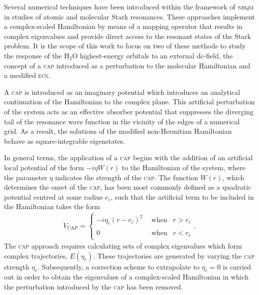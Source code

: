 Several numerical techniques have been introduced within the framework
of \textsc{nhqm} in studies of atomic and molecular Stark
resonances. These approaches implement a complex-scaled Hamiltonian by
means of a mapping operator that results in complex eigenvalues and
provide direct access to the resonant states of the Stark problem. It
is the scope of this work to focus on two of these methods to study
the response of the H$_{2}$O highest-energy orbitals to an external
dc-field, the concept of a \textsc{cap} introduced as a perturbation
to the molecular Hamiltonian and a modified \textsc{ecs}.




A \textsc{cap} is introduced as an imaginary potential which
introduces an analytical continuation of the Hamiltonian to the
complex plane. This artificial perturbation of the system acts as an
effective absorber potential that suppresses the diverging tail of the
resonance wave function in the vicinity of the edges of a numerical
grid. As a result, the solutions of the modified non-Hermitian
Hamiltonian behave as square-integrable eigenstates.

In general terms, the application of a \textsc{cap} begins with the
addition of an artificial local potential of the form $-i \eta W(r)$
to the Hamiltonian of the system, where the parameter $\eta$ indicates
the strength of the \textsc{cap}. The function $W(r)$, which
determines the onset of the \textsc{cap}, has been most commonly
defined as a quadratic potential centred at some radius
$r_{\mathrm{c}}$, such that the artificial term to be included in the
Hamiltonian takes the form
%
\begin{eqnarray}
  V_{\mathrm{CAP}} = \left\{
  \begin{split}
    -i \eta_{\mathrm{c}} (r - r_{\mathrm{c}})^{2} \
    & \mathrm{~when} & r > r_{\mathrm{c}} \\
    0 \phantom{i \eta_{\mathrm{c}}(r - r_{\mathrm{c}})^{2}} \
    & \mathrm{~when} &  r < r_{\mathrm{c}}
  \end{split}
  \right.
  .
\label{eq:VCAP}
\end{eqnarray}
%
The \textsc{cap} approach requires calculating sets of complex
eigenvalues which form complex trajectories,
$E(\eta_{\mathrm{c}})$. These trajectories are generated by varying
the \textsc{cap} strength $\eta_{\mathrm{c}}$. Subsequently, a
correction scheme to extrapolate to $\eta_{\mathrm{c}} = 0$ is carried
out in order to obtain the eigenvalues of a complex-scaled Hamiltonian
in which the perturbation introduced by the \textsc{cap} has been
removed.

